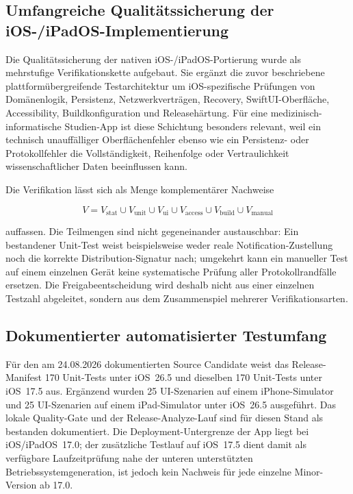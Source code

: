 
\begin{neu}
\section{Umfangreiche Qualitätssicherung der iOS-/iPadOS-Implementierung}

Die Qualitätssicherung der nativen iOS-/iPadOS-Portierung wurde als mehrstufige Verifikationskette aufgebaut. Sie ergänzt die zuvor beschriebene plattformübergreifende Testarchitektur um iOS-spezifische Prüfungen von Domänenlogik, Persistenz, Netzwerkverträgen, Recovery, SwiftUI-Oberfläche, Accessibility, Buildkonfiguration und Releasehärtung. Für eine medizinisch-informatische Studien-App ist diese Schichtung besonders relevant, weil ein technisch unauffälliger Oberflächenfehler ebenso wie ein Persistenz- oder Protokollfehler die Vollständigkeit, Reihenfolge oder Vertraulichkeit wissenschaftlicher Daten beeinflussen kann.

Die Verifikation lässt sich als Menge komplementärer Nachweise

\[
V = V_{\mathrm{stat}}
\cup V_{\mathrm{unit}}
\cup V_{\mathrm{ui}}
\cup V_{\mathrm{access}}
\cup V_{\mathrm{build}}
\cup V_{\mathrm{manual}}
\]

auffassen. Die Teilmengen sind nicht gegeneinander austauschbar: Ein bestandener Unit-Test weist beispielsweise weder reale Notification-Zustellung noch die korrekte Distribution-Signatur nach; umgekehrt kann ein manueller Test auf einem einzelnen Gerät keine systematische Prüfung aller Protokollrandfälle ersetzen. Die Freigabeentscheidung wird deshalb nicht aus einer einzelnen Testzahl abgeleitet, sondern aus dem Zusammenspiel mehrerer Verifikationsarten.

\subsection{Dokumentierter automatisierter Testumfang}

Für den am 24.08.2026 dokumentierten Source Candidate weist das Release-Manifest 170 Unit-Tests unter iOS~26.5 und dieselben 170 Unit-Tests unter iOS~17.5 aus. Ergänzend wurden 25 UI-Szenarien auf einem iPhone-Simulator und 25 UI-Szenarien auf einem iPad-Simulator unter iOS~26.5 ausgeführt. Das lokale Quality-Gate und der Release-Analyze-Lauf sind für diesen Stand als bestanden dokumentiert. Die Deployment-Untergrenze der App liegt bei iOS/iPadOS~17.0; der zusätzliche Testlauf auf iOS~17.5 dient damit als verfügbare Laufzeitprüfung nahe der unteren unterstützten Betriebssystemgeneration, ist jedoch kein Nachweis für jede einzelne Minor-Version ab 17.0.


\end{neu}
